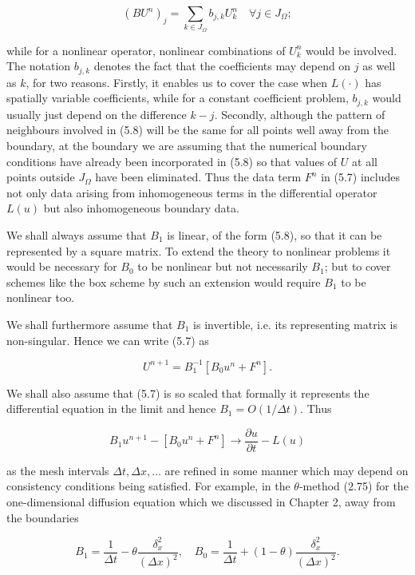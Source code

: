 \documentclass[10pt]{article}
\begin{document}
\[
\left(B U^{n}\right)_{j}=\sum_{k \in J_{\Omega}} b_{j, k} U_{k}^{n} \quad \forall j \in J_{\Omega} ;
\]

while for a nonlinear operator, nonlinear combinations of \(U_{k}^{n}\) would be involved. The notation \(b_{j, k}\) denotes the fact that the coefficients may depend on \(j\) as well as \(k\), for two reasons. Firstly, it enables us to cover the case when \(L(\cdot)\) has spatially variable coefficients, while for a constant coefficient problem, \(b_{j, k}\) would usually just depend on the difference \(k-j\). Secondly, although the pattern of neighbours involved in (5.8) will be the same for all points well away from the boundary, at the boundary we are assuming that the numerical boundary conditions have already been incorporated in (5.8) so that values of \(U\) at all points outside \(J_{\Omega}\) have been eliminated. Thus the data term \(F^{n}\) in (5.7) includes not only data arising from inhomogeneous terms in the differential operator \(L(u)\) but also inhomogeneous boundary data.

We shall always assume that \(B_{1}\) is linear, of the form (5.8), so that it can be represented by a square matrix. To extend the theory to nonlinear problems it would be necessary for \(B_{0}\) to be nonlinear but not necessarily \(B_{1}\); but to cover schemes like the box scheme by such an extension would require \(B_{1}\) to be nonlinear too.

We shall furthermore assume that \(B_{1}\) is invertible, i.e. its representing matrix is non-singular. Hence we can write (5.7) as

\[
U^{n+1}=B_{1}^{-1}\left[B_{0} u^{n}+F^{n}\right] .
\]

We shall also assume that (5.7) is so scaled that formally it represents the differential equation in the limit and hence \(B_{1}=O(1 / \Delta t)\). Thus

\[
B_{1} u^{n+1}-\left[B_{0} u^{n}+F^{n}\right] \rightarrow \frac{\partial u}{\partial t}-L(u)
\]

as the mesh intervals \(\Delta t, \Delta x, \ldots\) are refined in some manner which may depend on consistency conditions being satisfied. For example, in the \(\theta\)-method (2.75) for the one-dimensional diffusion equation which we discussed in Chapter 2, away from the boundaries

\[
B_{1}=\frac{1}{\Delta t}-\theta \frac{\delta_{x}^{2}}{(\Delta x)^{2}}, \quad B_{0}=\frac{1}{\Delta t}+(1-\theta) \frac{\delta_{x}^{2}}{(\Delta x)^{2}} .
\]
\end{document}
